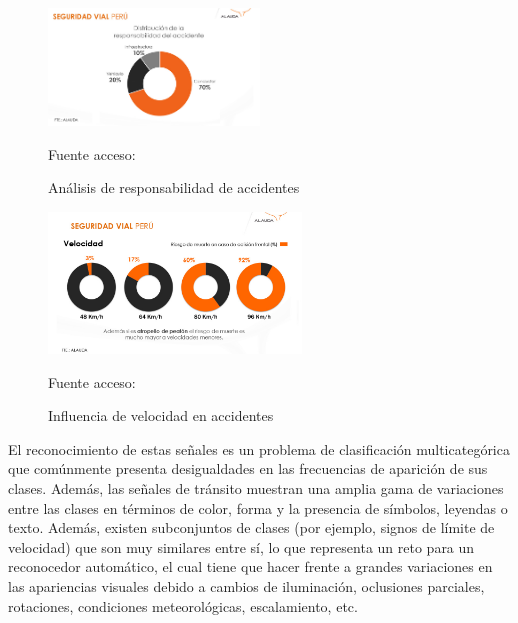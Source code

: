 	\begin{figure}[H]
	\begin{center}
	\includegraphics[width=0.5\textwidth]{images/intro/responsabilidad_cond}
	\end{center}
	\begin{center}
	\caption{\small{Análisis de responsabilidad de accidentes}}
	{\small{Fuente acceso: \cite{Gestion1}}}
	\end{center}
	\vspace{-1.5em}
	\end{figure}

	\begin{figure}[H]
	\begin{center}
	\includegraphics[width=0.6\textwidth]{images/intro/velocidad_ind}
	\end{center}
	\begin{center}
	\caption{\small{Influencia de velocidad en accidentes}}
	{\small{Fuente acceso: \cite{Gestion1}}}
	\end{center}
	\vspace{-1.5em}
	\end{figure}
	
	
	El reconocimiento de estas señales es un problema de clasificación multicategórica que comúnmente presenta desigualdades en las frecuencias de aparición de sus clases. Además, las señales de tránsito muestran una amplia gama de variaciones entre las clases en términos de color, forma y la presencia de símbolos, leyendas o texto. Además, existen subconjuntos de clases (por ejemplo, signos de límite de velocidad) que son muy similares entre sí, lo que representa un reto para un reconocedor  automático, el cual tiene que hacer frente a grandes variaciones en las apariencias visuales debido a cambios de iluminación, oclusiones parciales, rotaciones, condiciones meteorológicas, escalamiento, etc.
    

